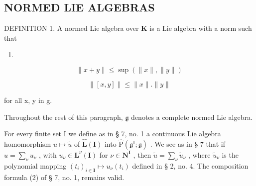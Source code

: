 \subsection{NORMED LIE ALGEBRAS}

DEFINITION 1. A normed Lie algebra over \(\mathbf{K}\) is a Lie algebra with a norm such that

\begin{enumerate}
\def\labelenumi{(\arabic{enumi})}
\setcounter{enumi}{7}
\tightlist
\item
\end{enumerate}

\[
\| x + y \| \leqslant \sup (\| x \|, \| y \|)\tag{8}
\]

\[
\| [ x, y ] \| \leqslant \| x \|. \| y \|\tag{9}
\]

for all x, y in g.

Throughout the rest of this paragraph, \(\mathfrak{g}\) denotes a complete normed Lie algebra.

For every finite set I we define as in § 7, no. 1 a continuous Lie algebra homomorphism \(u \mapsto \tilde{u}\) of \(\hat{\mathbf{L}}(\mathbf{I})\) into \(\hat{\mathrm{P}}(\mathfrak{g}^{\mathrm{I}}; \mathfrak{g})\) . We see as in § 7 that if \(u = \sum_{\nu} u_{\nu}\) , with \(u_{\nu} \in \mathbf{L}^{\nu}(\mathbf{I})\) for \(\nu \in \mathbf{N}^{\mathbf{I}}\) , then \(\tilde{u} = \sum_{\nu} \tilde{u}_{\nu}\) , where \(\tilde{u}_{\nu}\) is the polynomial mapping \((t_i)_{i \in \mathbf{I}} \mapsto u_{\nu}(t_i)\) defined in § 2, no. 4. The composition formula (2) of § 7, no. 1, remains valid.

